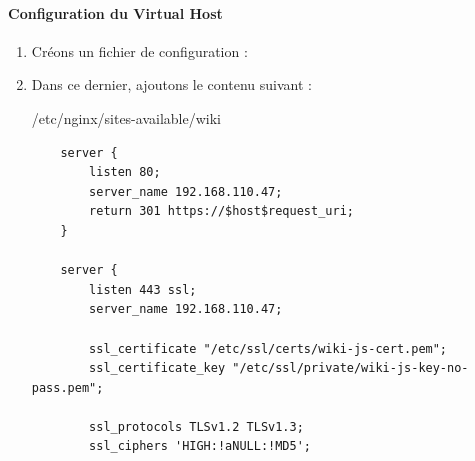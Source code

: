 \documentclass{article}
\begin{document}
\paragraph{Configuration du Virtual Host\\}

\begin{enumerate}
	\item Créons un fichier de configuration :
	\item Dans ce dernier, ajoutons le contenu suivant :
\begin{configbox}{/etc/nginx/sites-available/wiki}
\begin{lstlisting}
	server {
		listen 80;
		server_name 192.168.110.47;
		return 301 https://$host$request_uri;
	}
	
	server {
		listen 443 ssl;
		server_name 192.168.110.47;
	
		ssl_certificate "/etc/ssl/certs/wiki-js-cert.pem";
		ssl_certificate_key "/etc/ssl/private/wiki-js-key-no-pass.pem";
	
		ssl_protocols TLSv1.2 TLSv1.3;
		ssl_ciphers 'HIGH:!aNULL:!MD5';
	

\end{lstlisting}
\end{configbox}
\end{enumerate}
\end{document}
